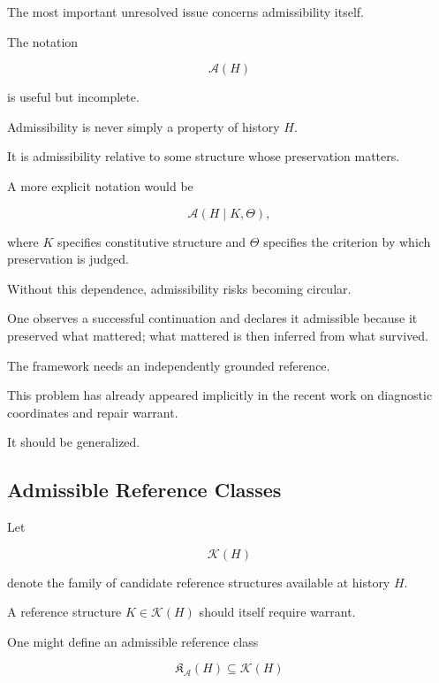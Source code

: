 \documentclass[11pt]{article}
\theoremstyle{remark}
\newcommand{\Adm}{\mathcal{A}}
\begin{document}
The most important unresolved issue concerns admissibility itself.

The notation

\begin{equation}
\Adm(H)
\end{equation}

is useful but incomplete.

Admissibility is never simply a property of history $H$.

It is admissibility relative to some structure whose preservation matters.

A more explicit notation would be

\begin{equation}
\Adm(H\mid K,\Theta),
\end{equation}

where $K$ specifies constitutive structure and $\Theta$ specifies the criterion by which preservation is judged.

Without this dependence, admissibility risks becoming circular.

One observes a successful continuation and declares it admissible because it preserved what mattered; what mattered is then inferred from what survived.

The framework needs an independently grounded reference.

This problem has already appeared implicitly in the recent work on diagnostic coordinates and repair warrant.

It should be generalized.

\subsection{Admissible Reference Classes}

Let

\begin{equation}
\mathcal{K}(H)
\end{equation}

denote the family of candidate reference structures available at history $H$.

A reference structure $K\in\mathcal{K}(H)$ should itself require warrant.

One might define an admissible reference class

\begin{equation}
\mathfrak{K}_{\Adm}(H)
\subseteq
\mathcal{K}(H)
\end{equation}
\end{document}

